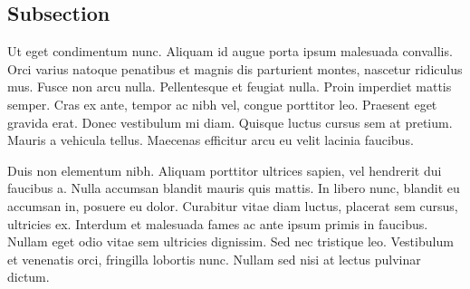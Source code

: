 \documentclass[draft]{yorkUThesisTemplate}
\begin{document}
\subsection{Subsection}
Ut eget condimentum nunc. Aliquam id augue porta ipsum malesuada convallis. Orci varius natoque penatibus et magnis dis parturient montes, nascetur ridiculus mus. Fusce non arcu nulla. Pellentesque et feugiat nulla. Proin imperdiet mattis semper. Cras ex ante, tempor ac nibh vel, congue porttitor leo. Praesent eget gravida erat. Donec vestibulum mi diam. Quisque luctus cursus sem at pretium. Mauris a vehicula tellus. Maecenas efficitur arcu eu velit lacinia faucibus.

Duis non elementum nibh. Aliquam porttitor ultrices sapien, vel hendrerit dui faucibus a. Nulla accumsan blandit mauris quis mattis. In libero nunc, blandit eu accumsan in, posuere eu dolor. Curabitur vitae diam luctus, placerat sem cursus, ultricies ex. Interdum et malesuada fames ac ante ipsum primis in faucibus. Nullam eget odio vitae sem ultricies dignissim. Sed nec tristique leo. Vestibulum et venenatis orci, fringilla lobortis nunc. Nullam sed nisi at lectus pulvinar dictum.
\end{document}
